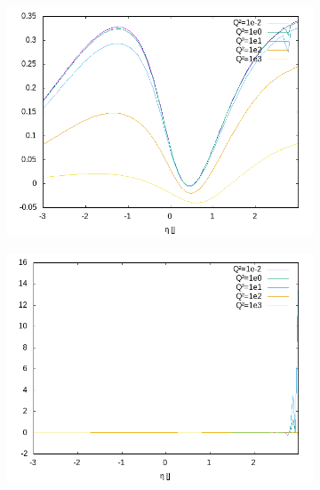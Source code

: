 \begin{figure}[ht!]
\centering
\begin{subfigure}[t]{.3\textwidth}
	\includegraphics[width=\textwidth]{../../img2/partonic/cg1_VV_F2}
\end{subfigure}%
\begin{subfigure}[t]{.3\textwidth}
	\includegraphics[width=\textwidth]{../../img2/partonic/cg1_VV_FL}
\end{subfigure}%
\begin{subfigure}[t]{.3\textwidth}

\end{subfigure}
\end{figure}
